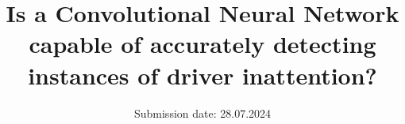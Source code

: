 

\subject{Project Report}
\title{Is a Convolutional Neural Network capable of accurately detecting instances of
driver inattention?}
\date{%
  Submission date: 28.07.2024
}



\maketitle
\thispagestyle{empty}
\tableofcontents
\newpage






\newpage
\nocite{*}
\printbibliography

